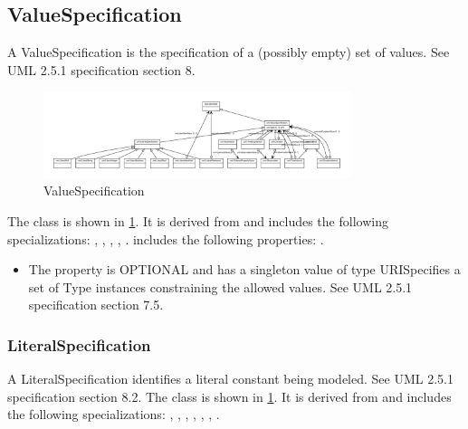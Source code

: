 %
\normalsize%
\subsection{ValueSpecification}%
\label{sec:uml:ValueSpecification}%
A ValueSpecification is the specification of a (possibly empty) set of values. See UML 2.5.1 specification section 8.%
\linebreak%
\linebreak%


\begin{figure}[h!]%
\centering%
\includegraphics[width=0.8\textwidth]{uml_classes/ValueSpecification_abstraction_hierarchy.pdf}%
\caption{ValueSpecification}%
\label{fig:ValueSpecification}%
\end{figure}

%
The  class is shown in \ref{fig:ValueSpecification}. It is derived from  and includes the following specializations: , , , , . %
 includes the following properties: . %
\begin{itemize}%
\item%
The  property is OPTIONAL and has a singleton value of type URISpecifies a set of Type instances constraining the allowed values. See UML 2.5.1 specification section 7.5.%
\end{itemize}%
\subsubsection{LiteralSpecification}%
\label{sec:uml:LiteralSpecification}%
A LiteralSpecification identifies a literal constant being modeled. See UML 2.5.1 specification section 8.2.%
\linebreak%
\linebreak%
The  class is shown in \ref{fig:ValueSpecification}. It is derived from  and includes the following specializations: , , , , , , . %
%

